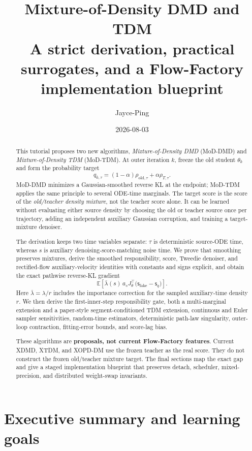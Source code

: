 \documentclass[11pt,a4paper]{article}
\title{\textbf{Mixture-of-Density DMD and TDM}\\[0.35em]
\large A strict derivation, practical surrogates, and a Flow-Factory implementation blueprint}
\author{Jayce-Ping}
\date{2026-08-03}
\newcommand{\E}{\mathbb{E}}
\newcommand{\old}{\mathrm{old}}
\newcommand{\fake}{\mathrm{fake}}
\newcommand{\score}{\mathsf{s}}
\theoremstyle{plain}
\theoremstyle{definition}
\begin{document}
\maketitle

\begin{abstract}
This tutorial proposes two new algorithms, \emph{Mixture-of-Density DMD} (MoD-DMD) and
\emph{Mixture-of-Density TDM} (MoD-TDM).  At outer iteration $k$, freeze the old student
$\theta_k$ and form the probability target
\[
q_{k,\tau}=(1-\alpha)\rho_{\old,\tau}+\alpha\rho_{T,\tau}.
\]
MoD-DMD minimizes a Gaussian-smoothed reverse KL at the endpoint; MoD-TDM applies the same
principle to several ODE-time marginals.  The target score is the score of the
\emph{old/teacher density mixture}, not the teacher score alone.  It can be learned without
evaluating either source density by choosing the old or teacher source once per trajectory,
adding an independent auxiliary Gaussian corruption, and training a target-mixture denoiser.

The derivation keeps two time variables separate: $\tau$ is deterministic source-ODE time,
whereas $s$ is auxiliary denoising-score-matching noise time.  We prove that smoothing preserves
mixtures, derive the smoothed responsibility, score, Tweedie denoiser, and rectified-flow
auxiliary-velocity identities with constants and signs explicit, and obtain the exact pathwise
reverse-KL gradient
\[
\E\!\left[\bar\lambda(s)\,a_s J_\theta^\top
  \bigl(\score_{\fake}-\score_q\bigr)\right].
\]
Here $\bar\lambda=\lambda/r$ includes the importance correction for the sampled auxiliary-time
density $r$.  We then derive the first-inner-step responsibility gate, both a multi-marginal
extension and a paper-style segment-conditioned TDM extension, continuous and Euler sampler
sensitivities, random-time estimators, deterministic path-law singularity, outer-loop
contraction, fitting-error bounds, and score-lag bias.

These algorithms are \textbf{proposals, not current Flow-Factory features}.  Current XDMD,
XTDM, and XOPD-DM use the frozen teacher as the real score.
They do not construct the frozen old/teacher mixture target.  The final sections map the exact
gap and give a staged implementation blueprint that preserves detach, scheduler, mixed-precision,
and distributed weight-swap invariants.
\end{abstract}

\tableofcontents
\newpage

\section{Executive summary and learning goals}
\label{sec:summary}
\end{document}
